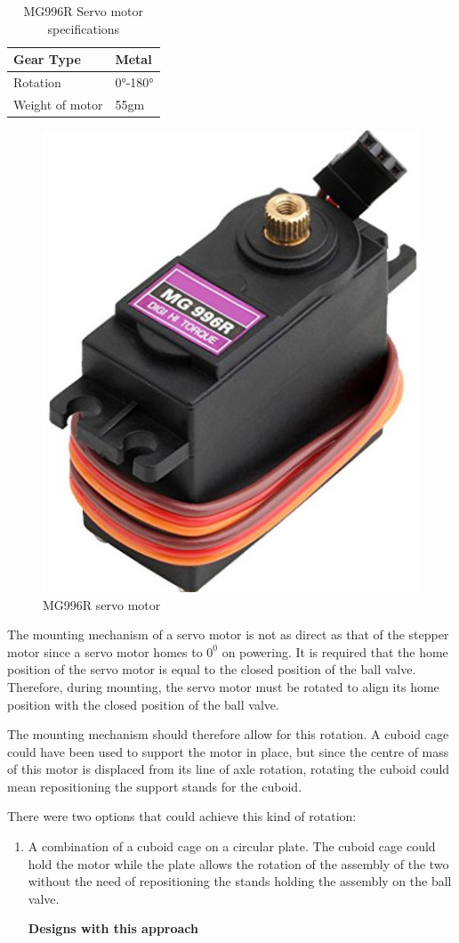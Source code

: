 \begin{enumerate}
\begin{enumerate}
\begin{table}[H]
\begin{tabular}{|l|l|}
    Gear Type & Metal \\ \hline
    Rotation & 0°-180° \\ \hline
    Weight of motor & 55gm \\ \hline
    \end{tabular}
    \caption[MG996R Servo motor specifications]{MG996R Servo motor specifications \cite{mg996r}}
    \label{tab:MG996R_servo_specs}
    \end{table}
    \begin{figure}[H]
        \centering
        \includegraphics[width=.25\textwidth, height=.25\textheight]{Figures/MG996R.jpg}
        \caption{MG996R servo motor}
        \label{fig:servo_motor_assembly}
    \end{figure}
    The mounting mechanism of a servo motor is not as direct as that of the stepper motor since a servo motor homes to $0^{0}$ on powering. It is required that the home position of the servo motor is equal to the closed position of the ball valve. Therefore, during mounting, the servo motor must be rotated to align its home position with the closed position of the ball valve.
    \par
    The mounting mechanism should therefore allow for this rotation. A cuboid cage could have been used to support the motor in place, but since the centre of mass of this motor is displaced from its line of axle rotation, rotating the cuboid could mean repositioning the support stands for the cuboid.
    \par
     There were two options that could achieve this kind of rotation:
     \begin{enumerate}
         \item A combination of a cuboid cage on a circular plate. The cuboid cage could hold the motor while the plate allows the rotation of the assembly of the two without the need of repositioning the stands holding the assembly on the ball valve.
         \par
         \textbf{Designs with this approach}
         \par
         \begin{itemize}

\end{itemize}
\end{enumerate}
\end{enumerate}
\end{enumerate}
